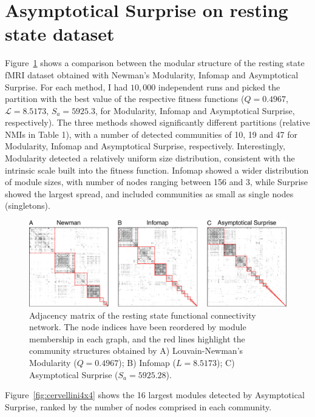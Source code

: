 \section{Asymptotical Surprise on resting state dataset}
Figure~\ref{fig:partitioncomparison} shows a comparison between the modular structure of the resting state fMRI dataset obtained with Newman's Modularity, Infomap and Asymptotical Surprise.
For each method, I had $10,000$ independent runs and picked the partition with the best value of the respective fitness functions ($Q=0.4967$, $\mathcal{L}=8.5173$, $S_a=5925.3$, for Modularity, Infomap and Asymptotical Surprise, respectively).
The three methods showed significantly different partitions (relative NMIs in Table 1), with a number of detected communities of 10, 19 and 47 for Modularity, Infomap and Asymptotical Surprise, respectively.
Interestingly, Modularity detected a relatively uniform size distribution, consistent with the intrinsic scale built into the fitness function.
Infomap showed a wider distribution of module sizes, with number of nodes ranging between 156 and 3, while Surprise showed the largest spread, and included communities as small as single nodes (singletons).
\begin{figure}[!htb]
\centering
\includegraphics[width=\textwidth]{images/pacopaperfigure6.pdf}
\caption{Adjacency matrix of the resting state functional connectivity network.
The node indices have been reordered by module membership in each graph, and the red lines highlight the community structures obtained by A) Louvain-Newman's Modularity ($Q=0.4967$); B) Infomap ($L=8.5173$); C) Asymptotical Surprise ($S_a=5925.28$).}
\label{fig:partitioncomparison}
\end{figure}

Figure~\ref{fig:cervellini4x4} shows the 16 largest modules detected by Asymptotical Surprise, ranked by the number of nodes comprised in each community.

